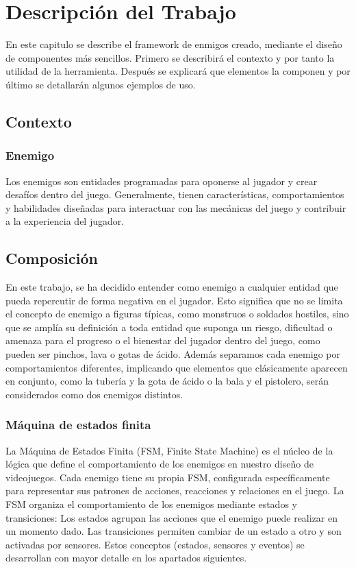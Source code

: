 \chapter{Descripción del Trabajo}
\label{cap:descripcionTrabajo}
En este capitulo se describe el framework de enmigos creado, mediante el diseño de componentes más sencillos. 
Primero se describirá el contexto y por tanto la utilidad de la herramienta. Después se explicará que elementos la componen y por último se detallarán algunos ejemplos de uso. \\
\section{Contexto}
\subsection{Enemigo}
Los enemigos son entidades programadas para oponerse al jugador y crear desafíos dentro del juego. Generalmente, tienen características, comportamientos y habilidades diseñadas para interactuar con las mecánicas del juego y contribuir a la experiencia del jugador. \\

\section{Composición}
En este trabajo, se ha decidido entender como enemigo a cualquier entidad que pueda repercutir de forma negativa en el jugador. Esto significa que no se limita el concepto de enemigo a figuras típicas, como monstruos o soldados hostiles, sino que se amplía su definición a toda entidad que suponga un riesgo, dificultad o amenaza para el progreso o el bienestar del jugador dentro del juego, como pueden ser pinchos, lava o gotas de ácido.
Además separamos cada enemigo por comportamientos diferentes, implicando que elementos que clásicamente aparecen en conjunto, como la tubería y la gota de ácido o la bala y el pistolero, serán considerados como  dos enemigos distintos.\\

\subsection{Máquina de estados finita}

La Máquina de Estados Finita (FSM, Finite State Machine) es el núcleo de la lógica que define el comportamiento de los enemigos en nuestro diseño de videojuegos. Cada enemigo tiene su propia FSM, configurada específicamente para representar sus patrones de acciones, reacciones y relaciones en el juego. La FSM organiza el comportamiento de los enemigos mediante estados y transiciones:
Los estados agrupan las acciones que el enemigo puede realizar en un momento dado.
Las transiciones permiten cambiar de un estado a otro y son activadas por sensores.
Estos conceptos (estados, sensores y eventos) se desarrollan con mayor detalle en los apartados siguientes.


